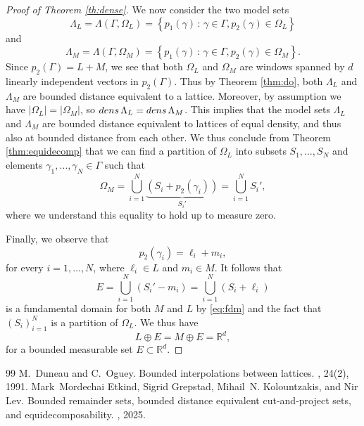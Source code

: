 \documentclass[10pt,a4paper]{amsart}
\newcommand{\RR}{{\mathbb R}}
\newcommand{\dens}{{\rm dens\,}}
\begin{document}
\begin{proof}[Proof of Theorem \ref{th:dense}]
We now consider the two model sets 
\begin{equation*}
\Lambda_L= \Lambda(\Gamma, \Omega_L) = \left\{ p_1(\gamma) \, : \, \gamma \in \Gamma , p_2(\gamma) \in \Omega_L \right\}
\end{equation*}
and
\begin{equation*}
\Lambda_M = \Lambda(\Gamma, \Omega_M) = \left\{ p_1(\gamma) \, : \, \gamma \in \Gamma , p_2(\gamma) \in \Omega_M \right\}.
\end{equation*}
Since $p_2(\Gamma) = L + M$, we see that both $\Omega_L$ and $\Omega_M$ are windows spanned by $d$ linearly independent vectors in $p_2(\Gamma)$. Thus by Theorem \ref{thm:do}, both $\Lambda_L$ and $\Lambda_M$ are bounded distance equivalent to a lattice. Moreover, by assumption we have $|\Omega_L|=|\Omega_M|$, so $\dens \Lambda_L= \dens \Lambda_M$. This implies that the model sets $\Lambda_L$ and $\Lambda_M$ are bounded distance equivalent to lattices of equal density, and thus also {at bounded distance from each other}. We thus conclude from Theorem \ref{thm:equidecomp} that we can find a partition of $\Omega_L$ into subsets $S_1, \ldots , S_N$ and elements $\gamma_1 , \ldots , \gamma_N \in \Gamma$ such that 
\begin{equation}\label{eq:fdm}
\Omega_M = \bigcup_{i=1}^N \underbrace{\left(S_i + p_2(\gamma_i) \right)}_{S_i'} = \bigcup_{i=1}^N S_i',
\end{equation}
where we understand this equality to hold up to measure zero.

Finally, we observe that 
\begin{equation*}
p_2(\gamma_i) = \ell_i + m_i, 
\end{equation*}
for every $i=1, \ldots , N$, where $\ell_i \in L$ and $m_i \in M$. It follows that
\begin{equation*}
E=\bigcup_{i=1}^N (S_i' - m_i) = \bigcup_{i=1}^N (S_i + \ell_i)
\end{equation*}
is a fundamental domain for both $M$ and $L$ by \eqref{eq:fdm} and the fact that $(S_i)_{i=1}^N$ is a partition of $\Omega_L$. We thus have
\begin{equation*}
L \oplus E = M \oplus E = \mathbb{R}^d,
\end{equation*}
for a bounded measurable set $E \subset \RR^d$.
\end{proof}

\begin{thebibliography}{99}
 M.~Duneau and C.~Oguey. \newblock Bounded interpolations between lattices. , 24(2), 1991.
 Mark~Mordechai Etkind, Sigrid Grepstad, Mihail~N. Kolountzakis, and Nir Lev. \newblock Bounded remainder sets, bounded distance equivalent cut-and-project sets, and equidecomposability. , 2025.
\end{thebibliography}
\end{document}
